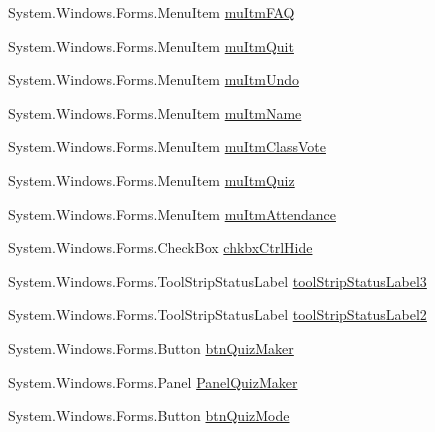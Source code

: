 \begin{DoxyCompactItemize}
\-System.\-Windows.\-Forms.\-Menu\-Item \hyperlink{class_sr_p___classroom_inq_1_1frm_classrrom_inq_aecb074ee2d728e4e88009f9a6f3c4f6d}{mu\-Itm\-F\-A\-Q}
\item 
\-System.\-Windows.\-Forms.\-Menu\-Item \hyperlink{class_sr_p___classroom_inq_1_1frm_classrrom_inq_a139fd89a3fbbc5272712ac921557dd03}{mu\-Itm\-Quit}
\item 
\-System.\-Windows.\-Forms.\-Menu\-Item \hyperlink{class_sr_p___classroom_inq_1_1frm_classrrom_inq_aa3e4ca1c9b69ec8008d53de0a7727b9f}{mu\-Itm\-Undo}
\item 
\-System.\-Windows.\-Forms.\-Menu\-Item \hyperlink{class_sr_p___classroom_inq_1_1frm_classrrom_inq_a62421b36b63800d99afde1f0494d3e5f}{mu\-Itm\-Name}
\item 
\-System.\-Windows.\-Forms.\-Menu\-Item \hyperlink{class_sr_p___classroom_inq_1_1frm_classrrom_inq_af00bacaa276c0e6c98e046aa01f73696}{mu\-Itm\-Class\-Vote}
\item 
\-System.\-Windows.\-Forms.\-Menu\-Item \hyperlink{class_sr_p___classroom_inq_1_1frm_classrrom_inq_a081ac032f68b26f56aaf3c859fb5faa3}{mu\-Itm\-Quiz}
\item 
\-System.\-Windows.\-Forms.\-Menu\-Item \hyperlink{class_sr_p___classroom_inq_1_1frm_classrrom_inq_afdc8efd0fa2025280bc6a44b8d71afc2}{mu\-Itm\-Attendance}
\item 
\-System.\-Windows.\-Forms.\-Check\-Box \hyperlink{class_sr_p___classroom_inq_1_1frm_classrrom_inq_a65b5726e5b2299abee70eba1a67b6ea3}{chkbx\-Ctrl\-Hide}
\item 
\-System.\-Windows.\-Forms.\-Tool\-Strip\-Status\-Label \hyperlink{class_sr_p___classroom_inq_1_1frm_classrrom_inq_a24d465fc0b54799fb86003278ae1e0c7}{tool\-Strip\-Status\-Label3}
\item 
\-System.\-Windows.\-Forms.\-Tool\-Strip\-Status\-Label \hyperlink{class_sr_p___classroom_inq_1_1frm_classrrom_inq_a453e5015dbeaefcb4cab17266e8db6ad}{tool\-Strip\-Status\-Label2}
\item 
\-System.\-Windows.\-Forms.\-Button \hyperlink{class_sr_p___classroom_inq_1_1frm_classrrom_inq_a521d725b634462f428d792ca3db59e2e}{btn\-Quiz\-Maker}
\item 
\-System.\-Windows.\-Forms.\-Panel \hyperlink{class_sr_p___classroom_inq_1_1frm_classrrom_inq_a1dd9af4cd0caad174e59e9038dcb8868}{\-Panel\-Quiz\-Maker}
\item 
\-System.\-Windows.\-Forms.\-Button \hyperlink{class_sr_p___classroom_inq_1_1frm_classrrom_inq_aed01a9041d00e0bef6cd7661bc9507d6}{btn\-Quiz\-Mode}
\item 

\end{DoxyCompactItemize}
